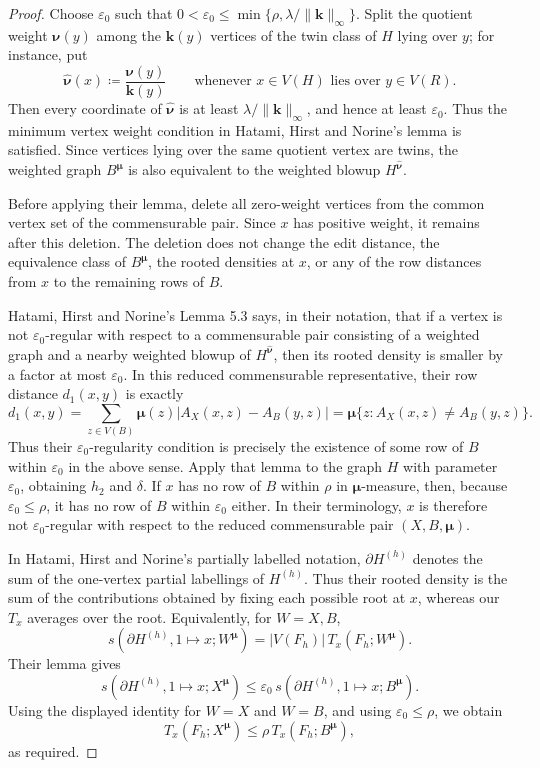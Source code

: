 \documentclass[10pt]{article}
\theoremstyle{plain}
\theoremstyle{remark}
\newcommand{\eps}{\varepsilon}
\newcommand{\bmu}{{\boldsymbol{\mu}}}
\newcommand{\bnu}{{\boldsymbol{\nu}}}
\begin{document}
\begin{proof}
Choose $\eps_0$ such that $0<\eps_0\le \min\{\rho,\lambda/\|\mathbf k\|_\infty\}$.
Split the quotient weight $\bnu(y)$ among the $\mathbf k(y)$ vertices of the twin class of $H$ lying over $y$; for instance, put
\[
        \widehat{\bnu}(x)\coloneqq \frac{\bnu(y)}{\mathbf k(y)}
        \qquad\text{whenever }x\in V(H)\text{ lies over }y\in V(R).
\]
Then every coordinate of $\widehat{\bnu}$ is at least $\lambda/\|\mathbf k\|_\infty$, and hence at least $\eps_0$. Thus the minimum vertex weight condition in Hatami, Hirst and Norine's lemma is satisfied. Since vertices lying over the same quotient vertex are twins, the weighted graph $B^\bmu$ is also equivalent to the weighted blowup $H^{\widehat{\bnu}}$.

Before applying their lemma, delete all zero-weight vertices from the common vertex set of the commensurable pair. Since $x$ has positive weight, it remains after this deletion. The deletion does not change the edit distance, the equivalence class of $B^\bmu$, the rooted densities at $x$, or any of the row distances from $x$ to the remaining rows of $B$.

Hatami, Hirst and Norine's Lemma 5.3 says, in their notation, that if a vertex is not $\eps_0$-regular with respect to a commensurable pair consisting of a weighted graph and a nearby weighted blowup of $H^{\widehat{\bnu}}$, then its rooted density is smaller by a factor at most $\eps_0$. In this reduced commensurable representative, their row distance $d_1(x,y)$ is exactly
\[
        d_1(x,y)=
        \sum_{z\in V(B)}\bmu(z)\left|A_X(x,z)-A_B(y,z)\right|
        =\bmu\{z:A_X(x,z)\ne A_B(y,z)\}.
\]
Thus their $\eps_0$-regularity condition is precisely the existence of some row of $B$ within $\eps_0$ in the above sense. Apply that lemma to the graph $H$ with parameter $\eps_0$, obtaining $h_2$ and $\delta$. If $x$ has no row of $B$ within $\rho$ in $\bmu$-measure, then, because $\eps_0\le\rho$, it has no row of $B$ within $\eps_0$ either. In their terminology, $x$ is therefore not $\eps_0$-regular with respect to the reduced commensurable pair $(X,B,\bmu)$.

In Hatami, Hirst and Norine's partially labelled notation, $\partial H^{(h)}$ denotes the sum of the one-vertex partial labellings of $H^{(h)}$. Thus their rooted density is the sum of the contributions obtained by fixing each possible root at $x$, whereas our $T_x$ averages over the root. Equivalently, for $W=X,B$,
\[
        s(\partial H^{(h)},1\mapsto x;W^\bmu)
        = |V(F_h)|\,T_x(F_h;W^\bmu).
\]
Their lemma gives
\[
        s(\partial H^{(h)},1\mapsto x;X^\bmu)
        \le \eps_0\,s(\partial H^{(h)},1\mapsto x;B^\bmu).
\]
Using the displayed identity for $W=X$ and $W=B$, and using $\eps_0\le\rho$, we obtain
\[
        T_x(F_h;X^\bmu)\le \rho\,T_x(F_h;B^\bmu),
\]
as required.
\end{proof}
\end{document}

